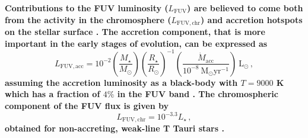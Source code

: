 \documentclass[fleqn,usenatbib]{mnras}
\begin{document}
\textbf{Contributions to the FUV luminosity ($L_\mathrm{FUV}$) are believed to come both from the activity in the chromosphere ($L_\mathrm{FUV,chr}$) and accretion hotspots on the stellar surface \citep[see e.g.][$L_\mathrm{FUV,acc}$]{Gorti2009}.
The accretion component, that is more important in the early stages of evolution, can be expressed as
\begin{equation}\label{eq:fuvacc}
L_\mathrm{FUV,acc} = 10^{-2} \left(\frac{M_\star}{M_\odot}\right)\left(\frac{R_\star}{R_\odot}\right)^{-1}\left(\frac{\dot{M}_\mathrm{acc}}{10^{-8} \ \mathrm{M}_\odot \mathrm{yr}^{-1}}\right) \ \mathrm{L}_\odot\,,
\end{equation}
assuming the accretion luminosity as a black-body with $T=9000$ K which has a fraction of $4\%$ in the FUV band \citep{Gorti2009}.
The chromospheric component of the FUV flux is given by
\begin{equation}\label{eq:fuvchr}
L_\mathrm{FUV,chr} = 10^{-3.3} L_\star\,,
\end{equation}
obtained for non-accreting, weak-line T Tauri stars \citep{Valenti2003}.}
\end{document}

